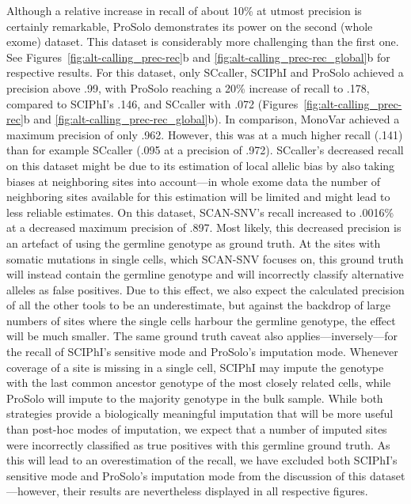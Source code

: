 \documentclass[authoryear,preprint,11pt]{scrartcl}
\begin{document}
Although a relative increase in recall of about 10\% at utmost precision is certainly remarkable, ProSolo demonstrates its power on the second (whole exome) dataset.
This dataset is considerably more challenging than the first one.
See Figures~\ref{fig:alt-calling_prec-rec}b and \ref{fig:alt-calling_prec-rec_global}b for respective results.
For this dataset, only SCcaller, SCIPhI and ProSolo achieved a precision above .99, with ProSolo reaching a 20\% increase of recall to .178, compared to SCIPhI's .146, and SCcaller with .072 (Figures~\ref{fig:alt-calling_prec-rec}b and \ref{fig:alt-calling_prec-rec_global}b).
In comparison, MonoVar achieved a maximum precision of only .962. However, this was at a much higher recall (.141) than for example SCcaller (.095 at a precision of .972).
SCcaller's decreased recall on this dataset might be due to its estimation of local allelic bias by also taking biases at neighboring sites into account---in whole exome data the number of neighboring sites available for this estimation will be limited and might lead to less reliable estimates.
On this dataset, SCAN-SNV's recall increased to .0016\% at a decreased maximum precision of .897.
Most likely, this decreased precision is an artefact of using the germline genotype as ground truth.
At the sites with somatic mutations in single cells, which SCAN-SNV focuses on, this ground truth will instead contain the germline genotype and will incorrectly classify alternative alleles as false positives.
Due to this effect, we also expect the calculated precision of all the other tools to be an underestimate, but against the backdrop of large numbers of sites where the single cells harbour the germline genotype, the effect will be much smaller.
The same ground truth caveat also applies---inversely---for the recall of SCIPhI's sensitive mode and ProSolo's imputation mode.
Whenever coverage of a site is missing in a single cell, SCIPhI may impute the genotype with the last common ancestor genotype of the most closely related cells, while ProSolo will impute to the majority genotype in the bulk sample.
While both strategies provide a biologically meaningful imputation that will be more useful than post-hoc modes of imputation, we expect that a number of imputed sites were incorrectly classified as true positives with this germline ground truth.
As this will lead to an overestimation of the recall, we have excluded both SCIPhI's sensitive mode and ProSolo's imputation mode from the discussion of this dataset---however, their results are nevertheless displayed in all respective figures.
\end{document}
